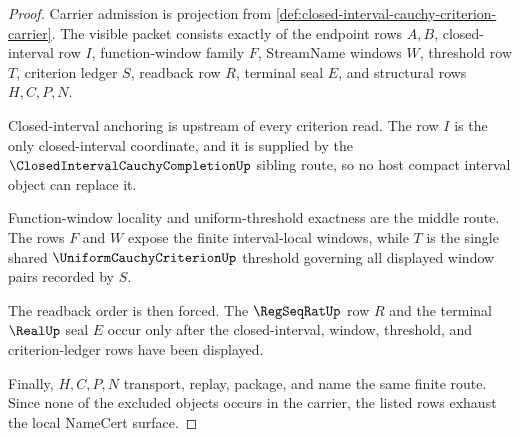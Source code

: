 \begin{proof}
Carrier admission is projection from \autoref{def:closed-interval-cauchy-criterion-carrier}. The visible packet consists exactly of the endpoint rows $A,B$, closed-interval row $I$, function-window family $F$, StreamName windows $W$, threshold row $T$, criterion ledger $S$, readback row $R$, terminal seal $E$, and structural rows $H,C,P,N$.

Closed-interval anchoring is upstream of every criterion read. The row $I$ is the only closed-interval coordinate, and it is supplied by the $\ClosedIntervalCauchyCompletionUp$ sibling route, so no host compact interval object can replace it.

Function-window locality and uniform-threshold exactness are the middle route. The rows $F$ and $W$ expose the finite interval-local windows, while $T$ is the single shared $\UniformCauchyCriterionUp$ threshold governing all displayed window pairs recorded by $S$.

The readback order is then forced. The $\RegSeqRatUp$ row $R$ and the terminal $\RealUp$ seal $E$ occur only after the closed-interval, window, threshold, and criterion-ledger rows have been displayed.

Finally, $H,C,P,N$ transport, replay, package, and name the same finite route. Since none of the excluded objects occurs in the carrier, the listed rows exhaust the local NameCert surface.
\end{proof}

